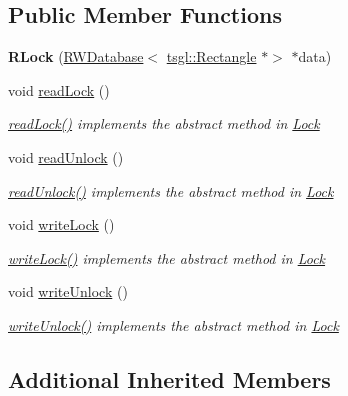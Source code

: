 \subsection*{Public Member Functions}
\begin{DoxyCompactItemize}
\item 
\mbox{\label{class_r_lock_a94f2c0fcd95500addf4d8dd124e1a2cd}} 
{\bfseries R\+Lock} (\hyperlink{class_r_w_database}{R\+W\+Database}$<$ \hyperlink{classtsgl_1_1_rectangle}{tsgl\+::\+Rectangle} $\ast$$>$ $\ast$data)
\item 
void \hyperlink{class_r_lock_a6445aacde1dc9a6f7769d1b1480d6162}{read\+Lock} ()
\begin{DoxyCompactList}\small\item\em \hyperlink{class_r_lock_a6445aacde1dc9a6f7769d1b1480d6162}{read\+Lock()} implements the abstract method in \hyperlink{class_lock}{Lock} \end{DoxyCompactList}\item 
void \hyperlink{class_r_lock_a0af51edce04598b0afe551d356cfe05b}{read\+Unlock} ()
\begin{DoxyCompactList}\small\item\em \hyperlink{class_r_lock_a0af51edce04598b0afe551d356cfe05b}{read\+Unlock()} implements the abstract method in \hyperlink{class_lock}{Lock} \end{DoxyCompactList}\item 
void \hyperlink{class_r_lock_ab04d415f49f28f6a8198f611d03e9bcd}{write\+Lock} ()
\begin{DoxyCompactList}\small\item\em \hyperlink{class_r_lock_ab04d415f49f28f6a8198f611d03e9bcd}{write\+Lock()} implements the abstract method in \hyperlink{class_lock}{Lock} \end{DoxyCompactList}\item 
void \hyperlink{class_r_lock_a4c69e6a1922b1aab3a84afeececad3fa}{write\+Unlock} ()
\begin{DoxyCompactList}\small\item\em \hyperlink{class_r_lock_a4c69e6a1922b1aab3a84afeececad3fa}{write\+Unlock()} implements the abstract method in \hyperlink{class_lock}{Lock} \end{DoxyCompactList}\end{DoxyCompactItemize}
\subsection*{Additional Inherited Members}


